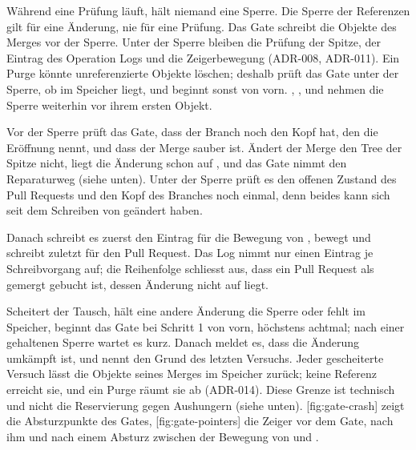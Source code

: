 Während eine Prüfung läuft, hält niemand eine Sperre.
Die Sperre der Referenzen gilt für eine Änderung, nie für eine Prüfung.
Das Gate schreibt die Objekte des Merges vor der Sperre.
Unter der Sperre bleiben die Prüfung der Spitze, der Eintrag des Operation Logs und die
Zeigerbewegung (ADR-008, ADR-011).
Ein Purge könnte unreferenzierte Objekte löschen; deshalb prüft das Gate unter der Sperre,
ob  im Speicher liegt, und beginnt sonst von vorn.
, ,  und  nehmen die Sperre weiterhin
vor ihrem ersten Objekt.

Vor der Sperre prüft das Gate, dass der Branch noch den Kopf hat, den die Eröffnung nennt, und
dass der Merge sauber ist.
Ändert der Merge den Tree der Spitze nicht, liegt die Änderung schon auf , und das
Gate nimmt den Reparaturweg (siehe unten).
Unter der Sperre prüft es den offenen Zustand des Pull Requests und den Kopf des Branches noch
einmal, denn beides kann sich seit dem Schreiben von  geändert haben.

Danach schreibt es zuerst den Eintrag  für die Bewegung von ,
bewegt  und schreibt zuletzt  für den Pull Request.
Das Log nimmt nur einen Eintrag je Schreibvorgang auf; die Reihenfolge schliesst aus,
dass ein Pull Request als gemergt gebucht ist, dessen Änderung nicht auf  liegt.

Scheitert der Tausch, hält eine andere Änderung die Sperre oder fehlt  im Speicher,
beginnt das Gate bei Schritt 1 von vorn, höchstens achtmal;
nach einer gehaltenen Sperre wartet es kurz.
Danach meldet es, dass die Änderung umkämpft ist, und nennt den Grund des letzten Versuchs.
Jeder gescheiterte Versuch lässt die Objekte seines Merges im Speicher zurück; keine Referenz
erreicht sie, und ein Purge räumt sie ab (ADR-014).
Diese Grenze ist technisch und nicht die Reservierung gegen Aushungern (siehe unten).
[fig:gate-crash] zeigt die Absturzpunkte des Gates,
[fig:gate-pointers] die Zeiger vor dem Gate, nach ihm und nach einem Absturz
zwischen der Bewegung von  und .

\startplacefigure[title={Ablauf des Merge-Gates mit Absturzpunkten},
    reference=fig:gate-crash,location=here]
\stopplacefigure

\startplacefigure[title={Zeiger beim Merge-Gate und der Reparaturweg},
    reference=fig:gate-pointers,location=here]
\stopplacefigure


